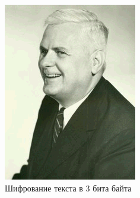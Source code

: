 \documentclass[10pt,a4paper,final]{article} %
\begin{document}
\begin{figure}[h!]
	\centering
	\begin{minipage}{0.3\textwidth}
		\centering
		\includegraphics[width=\linewidth]{img/Haskell_3}
		\caption{Шифрование текста в 3 бита байта}
	\end{minipage}
	\hspace{0.02\textwidth}
	\begin{minipage}{0.3\textwidth}
		\centering

\end{minipage}
\end{figure}
\end{document}
